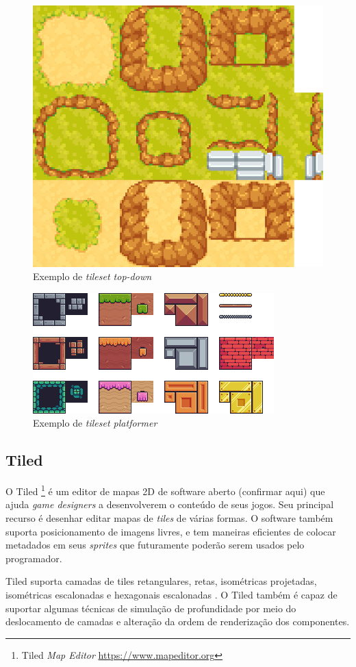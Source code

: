 \begin{figure}[h!]
    \centering
    \includegraphics[width=0.5\linewidth]{figuras/tileset.png}
    \caption{Exemplo de \textit{tileset top-down}}
    \label{fig:tileset-orthogonal}
\end{figure}
\begin{figure}[h!]
    \centering
    \includegraphics[width=0.5\linewidth]{figuras/tileset-orthogonal-platform.png}
    \caption{Exemplo de \textit{tileset platformer}}
    \label{fig:tileset-platform-orthogonal}
\end{figure}

\clearpage
\subsection{Tiled}
\label{sec:tiled}
O Tiled \footnote{Tiled \textit{Map Editor} \url{https://www.mapeditor.org}} é um editor de mapas 2D de software aberto (confirmar aqui) que ajuda \textit{game designers} a desenvolverem o conteúdo de seus jogos. Seu principal recurso é desenhar editar mapas de \textit{tiles} de várias formas. O software também suporta posicionamento de imagens livres, e tem maneiras eficientes de colocar metadados em seus \textit{sprites} que futuramente poderão serem usados pelo programador.

Tiled suporta camadas de tiles retangulares, retas, isométricas projetadas, isométricas escalonadas e hexagonais escalonadas \cite{tiled}.
O Tiled também é capaz de suportar algumas técnicas de simulação de profundidade por meio do deslocamento de camadas e alteração da ordem de renderização dos componentes.

